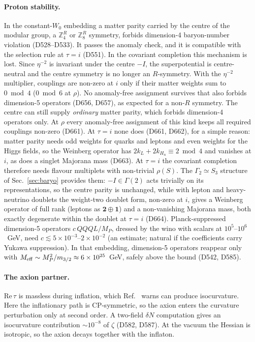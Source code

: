 \documentclass[aps,prd,twocolumn,superscriptaddress,nofootinbib,floatfix]{revtex4-2}
\begin{document}
\paragraph{Proton stability.} In the constant-$W_0$ embedding a matter parity carried by the centre of the modular group, a $\mathbb{Z}_4^R$ or $\mathbb{Z}_8^R$ symmetry, forbids dimension-4 baryon-number violation (D528--D533). It passes the anomaly check, and it is compatible with the selection rule at $\tau = i$ (D551). In the covariant completion this mechanism is lost. Since $\eta^{-2}$ is invariant under the centre $-I$, the superpotential is centre-neutral and the centre symmetry is no longer an $R$-symmetry. With the $\eta^{-2}$ multiplier, couplings are non-zero at $i$ only if their matter weights sum to $0\bmod4$ ($0\bmod6$ at $\rho$). No anomaly-free assignment survives that also forbids dimension-5 operators (D656, D657), as expected for a non-$R$ symmetry. The centre can still supply \emph{ordinary} matter parity, which forbids dimension-4 operators only. At $\rho$ every anomaly-free assignment of this kind keeps all required couplings non-zero (D661). At $\tau=i$ none does (D661, D662), for a simple reason: matter parity needs odd weights for quarks and leptons and even weights for the Higgs fields, so the Weinberg operator has $2k_L+2k_{H_u}\equiv2\bmod4$ and vanishes at $i$, as does a singlet Majorana mass (D663). At $\tau=i$ the covariant completion therefore needs flavour multiplets with non-trivial $\rho(S)$. The $\Gamma_2\simeq S_3$ structure of Sec.~\ref{sec:baryo} provides them: $-I\in\Gamma(2)$ acts trivially on its representations, so the centre parity is unchanged, while with lepton and heavy-neutrino doublets the weight-two doublet form, non-zero at $i$, gives a Weinberg operator of full rank (leptons as $\mathbf2\oplus\mathbf1$) and a non-vanishing Majorana mass, both exactly degenerate within the doublet at $\tau=i$ (D664). Planck-suppressed dimension-5 operators $c\,QQQL/M_P$, dressed by the wino with scalars at $10^5$--$10^6$~GeV, need $c\lesssim5\times10^{-3}$--$2\times10^{-2}$ (an estimate; natural if the coefficients carry Yukawa suppression). In that embedding, dimension-5 operators reappear only with $M_{\rm eff} \sim M_P^2/m_{3/2}\approx6\times10^{25}$~GeV, safely above the bound (D542, D585).

\paragraph{The axion partner.} $\mathrm{Re}\,\tau$ is massless during inflation, which Ref.~\cite{arXiv_2503_14904} warns can produce isocurvature. Here the inflationary path is CP-symmetric, so the axion enters the curvature perturbation only at second order. A two-field $\delta N$ computation gives an isocurvature contribution $\sim 10^{-8}$ of $\zeta$ (D582, D587). At the vacuum the Hessian is isotropic, so the axion decays together with the inflaton.
\end{document}
